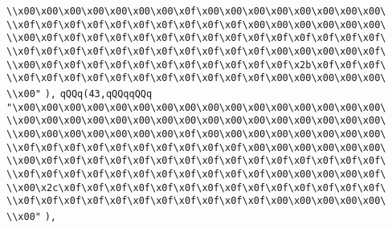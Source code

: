 \verb|\\x00\x00\x00\x00\x00\x00\x00\x0f\x00\x00\x00\x00\x00\x00\x00\x00\|\newline
\verb|\\x0f\x0f\x0f\x0f\x0f\x0f\x0f\x0f\x0f\x0f\x00\x00\x00\x00\x00\x00\|\newline
\verb|\\x00\x0f\x0f\x0f\x0f\x0f\x0f\x0f\x0f\x0f\x0f\x0f\x0f\x0f\x0f\x0f\|\newline
\verb|\\x0f\x0f\x0f\x0f\x0f\x0f\x0f\x0f\x0f\x0f\x0f\x00\x00\x00\x00\x0f\|\newline
\verb|\\x00\x0f\x0f\x0f\x0f\x0f\x0f\x0f\x0f\x0f\x0f\x0f\x2b\x0f\x0f\x0f\|\newline
\verb|\\x0f\x0f\x0f\x0f\x0f\x0f\x0f\x0f\x0f\x0f\x0f\x00\x00\x00\x00\x00\|\newline
\verb|\\x00"|\newline
\verb|),|\newline
\verb|qQQq(43,qQQqqQQq|\newline
\verb|"\x00\x00\x00\x00\x00\x00\x00\x00\x00\x00\x00\x00\x00\x00\x00\x00\|\newline
\verb|\\x00\x00\x00\x00\x00\x00\x00\x00\x00\x00\x00\x00\x00\x00\x00\x00\|\newline
\verb|\\x00\x00\x00\x00\x00\x00\x00\x0f\x00\x00\x00\x00\x00\x00\x00\x00\|\newline
\verb|\\x0f\x0f\x0f\x0f\x0f\x0f\x0f\x0f\x0f\x0f\x00\x00\x00\x00\x00\x00\|\newline
\verb|\\x00\x0f\x0f\x0f\x0f\x0f\x0f\x0f\x0f\x0f\x0f\x0f\x0f\x0f\x0f\x0f\|\newline
\verb|\\x0f\x0f\x0f\x0f\x0f\x0f\x0f\x0f\x0f\x0f\x0f\x00\x00\x00\x00\x0f\|\newline
\verb|\\x00\x2c\x0f\x0f\x0f\x0f\x0f\x0f\x0f\x0f\x0f\x0f\x0f\x0f\x0f\x0f\|\newline
\verb|\\x0f\x0f\x0f\x0f\x0f\x0f\x0f\x0f\x0f\x0f\x0f\x00\x00\x00\x00\x00\|\newline
\verb|\\x00"|\newline
\verb|),|\newline
